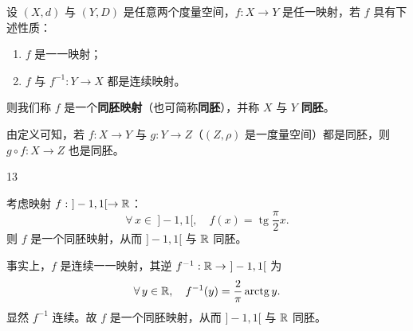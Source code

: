 \begin{mydef*}{}

设 $(X,d)$ 与 $(Y,D)$ 是任意两个度量空间，$f:X\to Y$ 是任一映射，若 $f$ 具有下述性质：

\begin{enumerate}[label=\arabic{enumi})]
\item $f$ 是一一映射；
\item $f$ 与 $f^{-1}:Y\to X$ 都是连续映射。
\end{enumerate}

则我们称 $f$ 是一个\textbf{同胚映射}（也可简称\textbf{同胚}），并称 $X$ 与 $Y$ \textbf{同胚}。

由定义可知，若 $f:X\to Y$ 与 $g:Y\to Z$（$(Z,\rho)$ 是一度量空间）都是同胚，则 $g\circ f:X\to Z$ 也是同胚。

\end{mydef*}

\begin{sourceexample}{13}

考虑映射 $f:\ ]-1,1[\to\mathbb{R}$：
\[\forall\,x\in\ ]-1,1[,\quad f(x)=\operatorname{tg}\frac{\pi}{2}x.\]
则 $f$ 是一个同胚映射，从而 $]-1,1[$ 与 $\mathbb{R}$ 同胚。

事实上，$f$ 是连续一一映射，其逆 $f^{-1}:\R\to\ ]-1,1[$ 为
\[\forall\,y\in\mathbb{R},\quad f^{-1}(y)=\frac{2}{\pi}\operatorname{arctg}y.\]
显然 $f^{-1}$ 连续。故 $f$ 是一个同胚映射，从而 $]-1,1[$ 与 $\mathbb{R}$ 同胚。

\end{sourceexample}

